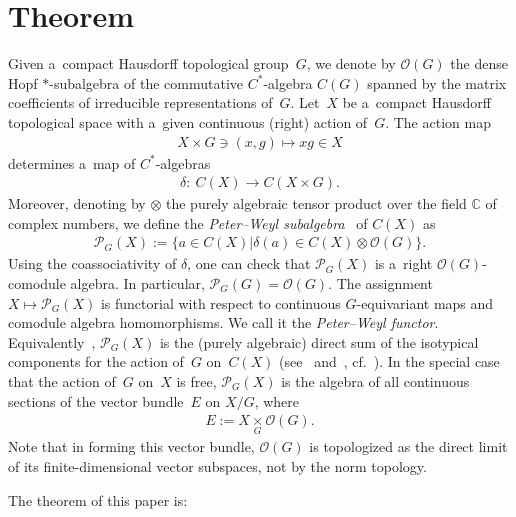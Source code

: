 \documentclass[11pt]{article}
\begin{document}
\section{Theorem}

Given a~compact Hausdorf\/f topological group~$G$, we denote by ${\mathcal O} (G)$ the dense Hopf $*$-subalgebra of the
commutative $C^{*}$-algebra $C(G)$ spanned by the matrix coef\/f\/icients of irreducible representations of~$G$.
Let~$X$ be a~compact Hausdorf\/f topological space with a~given continuous (right) action of~$G$.
The action map
\begin{gather*}
X\times G\ni (x,g)\longmapsto xg\in X
\end{gather*}
determines a~map of $C^{*}$-algebras
\begin{gather*}
\delta\colon \  C(X)\longrightarrow C(X\times G).
\end{gather*}
Moreover, denoting by $\otimes$ the purely algebraic tensor product over the f\/ield $\mathbb{C}$ of complex numbers, we
def\/ine the \emph{Peter--Weyl subalgebra}~\cite[(3.1.4)]{bhms} of $C(X)$ as
\begin{gather*}
\mathcal{P}_G(X):=\{a\in C(X)| \delta(a)\in C(X)\otimes{\mathcal O}(G)\}.
\end{gather*}
Using the coassociativity of $\delta$, one can check that $\mathcal{P}_G(X)$ is a~right ${\mathcal O} (G)$-comodule algebra.
In particular, $\mathcal{P}_G(G)={\mathcal O}(G)$.
The assignment $X\mapsto\mathcal{P}_G(X)$ is functorial with respect to continuous $G$-equivariant maps and comodule algebra homomorphisms.
We call it the \emph{Peter--Weyl functor}.
Equivalently~\cite[Proposition 2.2]{s-pm11}, $\mathcal{P}_G(X)$ is the (purely algebraic) direct sum of the isotypical
components for the action of~$G$ on~$C(X)$ (see~\cite[p.~31]{m-gd61} and~\cite{l-lh53}, cf.~\cite[Theorem~1.5.1]{p-p95}).
In the special case that the action of~$G$ on~$X$ is free, $\mathcal{P}_{G}(X)$ is the algebra of all continuous
sections of the vector bundle~$E$ on $X/G$, where
\begin{gather}\label{vecbun}
E:= X\underset{G}{\times}{\mathcal O}(G).
\end{gather}
Note that in forming this vector bundle, ${\mathcal O}(G)$ is topologized as the direct limit of its f\/inite-dimensional
vector subspaces, not by the norm topology.

The theorem of this paper is:
\end{document}
